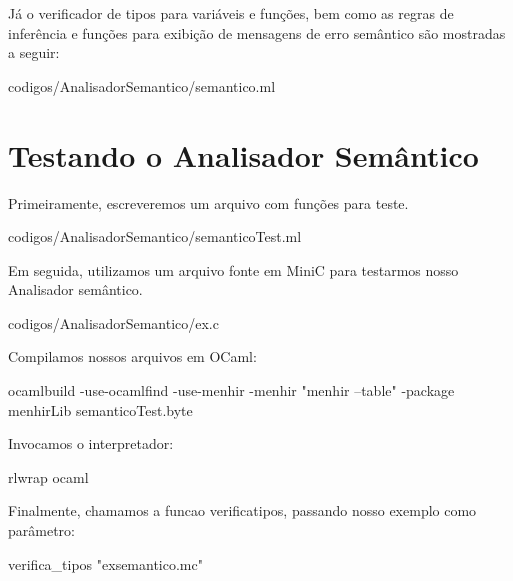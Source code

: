 \documentclass[12pt,a4paper,twoside]{report}
\begin{document}
Já o verificador de tipos para variáveis e funções, bem como as regras de inferência e funções para exibição de mensagens de erro semântico são mostradas a seguir:

 {codigos/AnalisadorSemantico/semantico.ml}

\section{Testando o Analisador Semântico}

Primeiramente, escreveremos um arquivo com funções para teste.

 {codigos/AnalisadorSemantico/semanticoTest.ml}

Em seguida, utilizamos um arquivo fonte em MiniC para testarmos nosso Analisador semântico.

 {codigos/AnalisadorSemantico/ex.c}

Compilamos nossos arquivos em OCaml:

\begin{terminal}
ocamlbuild -use-ocamlfind -use-menhir -menhir "menhir --table" -package menhirLib semanticoTest.byte
\end{terminal}

Invocamos o interpretador:

\begin{terminal}
rlwrap ocaml
\end{terminal}

Finalmente, chamamos a funcao verificatipos, passando nosso exemplo como parâmetro:

\begin{terminal}
verifica_tipos "exsemantico.mc"
\end{terminal}
\end{document}
